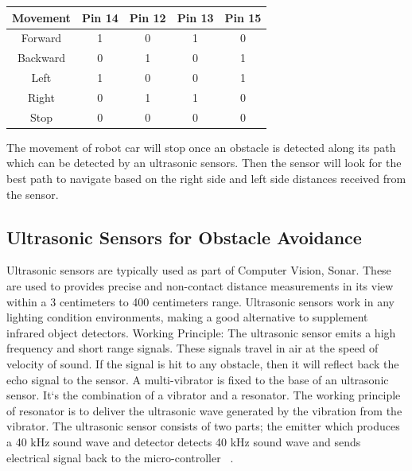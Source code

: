 \documentclass[sigconf]{acmart}
\begin{document}
\begin{center}
\begin{tabular}{ | c | c| c | c| c | } 
\hline
Movement & Pin 14 & Pin 12 & Pin 13 & Pin 15 \\ 
\hline
Forward & 1 & 0 & 1 & 0 \\ 
\hline
Backward & 0 & 1 & 0 & 1 \\
\hline
Left & 1 & 0 & 0 & 1 \\
\hline
Right & 0 & 1 & 1 & 0 \\
\hline
Stop  & 0 & 0 & 0 & 0 \\
\hline

\end{tabular}
\end{center}

The movement of robot car will stop once an obstacle is detected along its path which can be detected by an ultrasonic sensors. Then the sensor will look for the best path to navigate based on the right side and left side distances received from the sensor.

\subsection{Ultrasonic Sensors for Obstacle Avoidance}
Ultrasonic sensors are typically used as part of Computer Vision, Sonar. These are used to provides precise and non-contact distance measurements in its view within a 3 centimeters to 400 centimeters range. Ultrasonic sensors work in any lighting condition environments, making a good alternative to supplement infrared object detectors.
Working Principle: The ultrasonic sensor emits a high frequency and short range signals. These signals travel in air at the speed of velocity of sound. If the signal is hit to any obstacle, then it will reflect back the echo signal to the sensor. A multi-vibrator is fixed to the base of an ultrasonic sensor. It`s the combination of a vibrator and a resonator. The working principle of resonator is to  deliver the  ultrasonic wave generated by the vibration from the vibrator. The ultrasonic sensor consists of two parts; the emitter which produces a 40 kHz sound wave and detector detects 40 kHz sound wave and sends electrical signal back to the micro-controller ~\cite{ijedr2016}.
\end{document}
